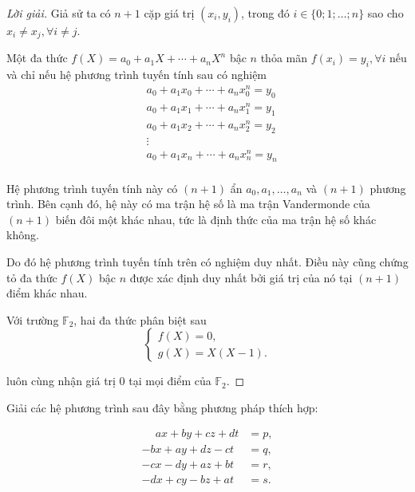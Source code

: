 \begin{proof}[Lời giải]
    Giả sử ta có $n + 1$ cặp giá trị $(x_{i}, y_{i})$, trong đó $i \in \{ 0; 1; \ldots; n \}$ sao cho $x_{i} \ne x_{j}, \forall i\ne j$.
    
    Một đa thức $f(X) = a_{0} + a_{1}X + \cdots + a_{n}X^{n}$ bậc $n$ thỏa mãn $f(x_{i}) = y_{i}, \forall i$ nếu và chỉ nếu hệ phương trình tuyến tính sau có nghiệm
    \begin{align*}
         & a_{0} + a_{1}x_{0} + \cdots + a_{n}x_{0}^{n} = y_{0} \\
         & a_{0} + a_{1}x_{1} + \cdots + a_{n}x_{1}^{n} = y_{1} \\
         & a_{0} + a_{1}x_{2} + \cdots + a_{n}x_{2}^{n} = y_{2} \\
         & \vdots                                               \\
         & a_{0} + a_{1}x_{n} + \cdots + a_{n}x_{n}^{n} = y_{n} \\
    \end{align*}
    
    Hệ phương trình tuyến tính này có $(n+1)$ ẩn $a_{0}, a_{1}, \ldots, a_{n}$ và $(n+1)$ phương trình. Bên cạnh đó, hệ này có ma trận hệ số là ma trận Vandermonde của $(n+1)$ biến đôi một khác nhau, tức là định thức của ma trận hệ số khác không.
    
    Do đó hệ phương trình tuyến tính trên có nghiệm duy nhất. Điều này cũng chứng tỏ đa thức $f(X)$ bậc $n$ được xác định duy nhất bởi giá trị của nó tại $(n+1)$ điểm khác nhau.
    
    \bigskip
    
    \bigskip
    
    Với trường $\mathbb{F}_{2}$, hai đa thức phân biệt sau
    \[
        \begin{cases}
            f(X) = 0, \\
            g(X) = X(X-1).
        \end{cases}
    \]
    
    luôn cùng nhận giá trị 0 tại mọi điểm của $\mathbb{F}_{2}$.
\end{proof}

Giải các hệ phương trình sau đây bằng phương pháp thích hợp:

\begin{exercise}
    \begin{align*}
        \phantom{-}ax + by + cz + dt & = p, \\
        -bx + ay + dz - ct           & = q, \\
        -cx - dy + az + bt           & = r, \\
        -dx + cy - bz + at           & = s.
    \end{align*}
\end{exercise}

